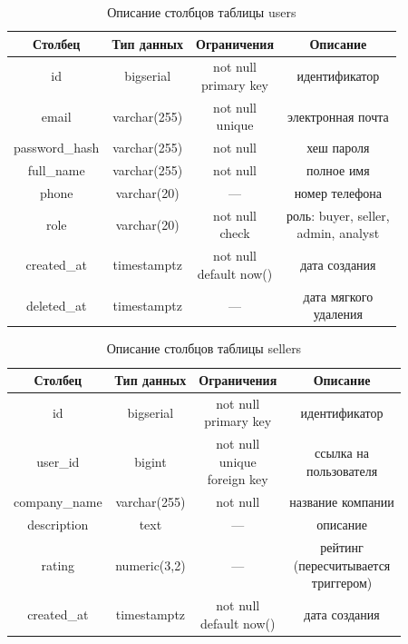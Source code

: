 \begin{table}[H]
    \caption{Описание столбцов таблицы users}
    \label{tbl:t_users}
    \rpzcompacttable
    \begin{tabular}[]{|c|c|c|c|}
        \hline
        \textbf{Столбец} & \textbf{Тип данных} & \textbf{Ограничения} & \textbf{Описание} \\ \hline
        id & bigserial & \makecell{not null \\ primary key} & идентификатор \\ \hline
        email & varchar(255) & \makecell{not null \\ unique} & электронная почта \\ \hline
        password\_hash & varchar(255) & not null & хеш пароля \\ \hline
        full\_name & varchar(255) & not null & полное имя \\ \hline
        phone & varchar(20) & --- & номер телефона \\ \hline
        role & varchar(20) & \makecell{not null \\ check} & \makecell{роль: buyer, seller,\\admin, analyst} \\ \hline
        created\_at & timestamptz & \makecell{not null \\ default now()} & дата создания \\ \hline
        deleted\_at & timestamptz & --- & \makecell{дата мягкого\\удаления} \\ \hline
    \end{tabular}
\end{table}

\begin{table}[H]
    \caption{Описание столбцов таблицы sellers}
    \label{tbl:t_sellers}
    \rpzcompacttable
    \begin{tabular}[]{|c|c|c|c|}
        \hline
        \textbf{Столбец} & \textbf{Тип данных} & \textbf{Ограничения} & \textbf{Описание} \\ \hline
        id & bigserial & \makecell{not null \\ primary key} & идентификатор \\ \hline
        user\_id & bigint & \makecell{not null \\ unique \\ foreign key} & \makecell{ссылка на\\пользователя} \\ \hline
        company\_name & varchar(255) & not null & название компании \\ \hline
        description & text & --- & описание \\ \hline
        rating & numeric(3,2) & --- & \makecell{рейтинг\\(пересчитывается\\триггером)} \\ \hline
        created\_at & timestamptz & \makecell{not null \\ default now()} & дата создания \\ \hline
    \end{tabular}
\end{table}


